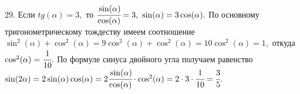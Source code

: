 29. Если $tg(\alpha)=3,$ то $\cfrac{\sin(\alpha)}{\cos(\alpha)}=3,\ \sin(\alpha)=3\cos(\alpha).$ По основному тригонометрическому тождеству имеем соотношение
$\sin^2(\alpha)+\cos^2(\alpha)=9\cos^2(\alpha)+\cos^2(\alpha)=10\cos^2(\alpha)=1,$ откуда $\cos^2(\alpha)=\cfrac{1}{10}.$ По формуле синуса двойного угла получаем
равенство $\sin(2\alpha)=2\sin(\alpha)\cos(\alpha)=2\cfrac{\sin(\alpha)}{\cos(\alpha)}\cdot\cos^2(\alpha)=2\cdot3\cdot\cfrac{1}{10}=\cfrac{3}{5}.$\\
